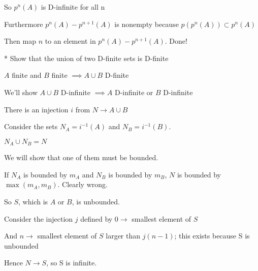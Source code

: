 \documentclass{article}
\begin{document}
So $p^n(A)$ is D-infinite for all n

Furthermore $p^n(A) - p^{n+1}(A)$ is nonempty because $p(p^n(A)) \subset p^n(A)$

Then map $n$ to an element in $p^n(A) - p^{n+1}(A)$. Done!

* Show that the union of two D-finite sets is D-finite

$A$ finite and $B$ finite $\implies A \cup B$ D-finite

We'll show $A \cup B$ D-infinite $\implies A$ D-infinite or $B$ D-infinite

There is an injection $i$ from $N \rightarrow A \cup B$

Consider the sets $N_A = i^{-1}(A)$ and $N_B = i^{-1}(B)$.

$N_A \cup N_B = N$

We will show that one of them must be bounded.

If $N_A$ is bounded by $m_A$ and $N_B$ is bounded by $m_B$, $N$ is bounded by $\max(m_A, m_B)$. Clearly wrong.

So $S$, which is $A$ or $B$, is unbounded.

Consider the injection $j$ defined by $0 \rightarrow$ smallest element of $S$

And $n \rightarrow$ smallest element of $S$ larger than $j(n-1)$; this exists because S is unbounded

Hence $N \rightarrow S$, so S is infinite.
\end{document}
